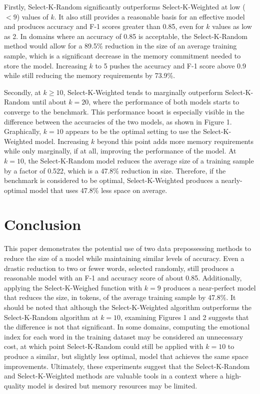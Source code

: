 \documentclass[11pt]{article}
\begin{document}
Firstly, Select-K-Random significantly outperforms Select-K-Weighted at low ($< 9$) values of $k$. It also still provides a reasonable basis for an effective model and produces accuracy and F-1 scores greater than 0.85, even for $k$ values as low as 2. In domains where an accuracy of 0.85 is acceptable, the Select-K-Random method would allow for a 89.5\% reduction in the size of an average training sample, which is a significant decrease in the memory commitment needed to store the model. Increasing $k$ to 5 pushes the accuracy and F-1 score above 0.9 while still reducing the memory requirements by 73.9\%.

Secondly, at $k \geq 10$, Select-K-Weighted tends to marginally outperform Select-K-Random until about $k=20$, where the performance of both models starts to converge to the benchmark. This performance boost is especially visible in the difference between the accuracies of the two models, as shown in Figure 1. Graphically, $k=10$ appears to be the optimal setting to use the Select-K-Weighted model. Increasing $k$ beyond this point adds more memory requirements while only marginally, if at all, improving the performance of the model. At $k=10$, the Select-K-Random model reduces the average size of a training sample by a factor of 0.522, which is a 47.8\% reduction in size. Therefore, if the benchmark is considered to be optimal, Select-K-Weighted produces a nearly-optimal model that uses 47.8\% less space on average.

\section{Conclusion}
This paper demonstrates the potential use of two data prepossessing methods to reduce the size of a model while maintaining similar levels of accuracy. Even a drastic reduction to two or fewer words, selected randomly, still produces a reasonable model with an F-1 and accuracy score of about 0.85. Additionally, applying the Select-K-Weighed function with $k=9$ produces a near-perfect model that reduces the size, in tokens, of the average training sample by 47.8\%. It should be noted that although the Select-K-Weighted algorithm outperforms the Select-K-Random algorithm at $k=10$, examining Figures 1 and 2 suggests that the difference is not that significant. In some domains, computing the emotional index for each word in the training dataset may be considered an unnecessary cost, at which point Select-K-Random could still be applied with $k=10$ to produce a similar, but slightly less optimal, model that achieves the same space improvements. Ultimately, these experiments suggest that the Select-K-Random and Select-K-Weighted methods are valuable tools in a context where a high-quality model is desired but memory resources may be limited.
\end{document}
